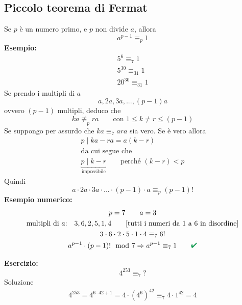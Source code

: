 \documentclass[italian]{article}
\newcommand{\divides}[2]{\text{$#1 \;|\; #2$}}
\renewcommand{\checkmark}{\textcolor{ForestGreen}{\text{$\qquad$\ding{52}}}}
\begin{document}
\subsection{Piccolo teorema di Fermat}
Se $p$ è un numero primo, e $p$ non divide $a$, allora 
\[ 
	a^{p-1} \equiv_p 1
\]
\textbf{Esempio:}
\begin{gather*}
	5^{6} \equiv_{7} 1 \\
	5^{30} \equiv_{31} 1 \\
	20^{30} \equiv_31 1
\end{gather*}
Se prendo i multipli di $a$ 
\[ 
	a,2a,3a,...,(p-1)a
\]
ovvero $ (p-1) $ multipli, deduco che
\[
	ka \not\equiv_p ra \qquad \text{con } 1 \leq k\neq r \leq(p-1)
\]
Se suppongo per assurdo che $ka \equiv_7 a ra$ sia vero. Se è vero allora
\begin{gather*}
	\divides{p}{ka-ra} = a(k-r)\\
	\text{da cui segue che} \\
	\underbracket{\divides{p}{k-r}}_{\text{impossibile}} \qquad \text{perché } (k-r) < p
\end{gather*}
Quindi
\[
	a \cdot 2a \cdot 3a \cdot ... \cdot (p-1)\cdot a \equiv_p (p-1)!
\]
\textbf{Esempio numerico:}
\begin{gather*}
	p=7 \qquad a=3\\
	\text{multipli di $a$:} \quad 3,6,2,5,1,4 \qquad \text{[tutti i numeri da 1 a 6 in disordine]}\\
	3\cdot 6\cdot 2\cdot 5\cdot 1\cdot 4 \equiv_7 6!\\
	a^{p-1} \cdot (p-1)! \mod{7}\Rightarrow a^{p-1} \equiv_7 1 \checkmark
\end{gather*}

\noindent\textbf{Esercizio:}
\[ 4^{253} \equiv_7 ? \]
Soluzione
\begin{gather*}
	4^{253} = 4^{6\cdot 42 + 1} = 4\cdot (4^{6})^{42} \equiv_7 4\cdot 1^{42} = 4
\end{gather*}

\newpage
\end{document}
